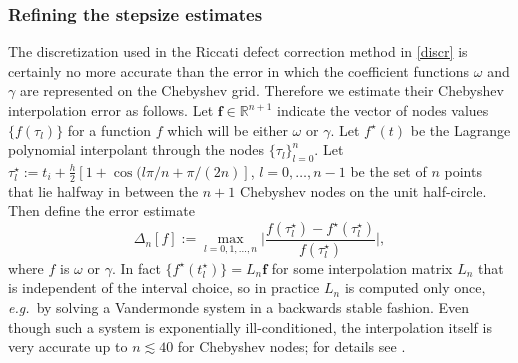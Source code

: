 \documentclass[10pt]{article}
\newcommand{\be}{\begin{equation}}
\newcommand{\ee}{\end{equation}}
\newcommand{\eg}{{\it e.g.\ }}
\newcommand{\mbf}[1]{{\mathbf #1}}
\newcommand{\R}{\mathbb{R}}
\newcommand{\om}{\omega}
\newcommand{\g}{\gamma}
\begin{document}
\subsubsection{Refining the stepsize estimates}

%

The discretization used in the Riccati defect correction method in \cref{discr} is certainly no more accurate than
the error in which the coefficient functions $\om$ and $\g$ are represented
on the Chebyshev grid.
Therefore we estimate their Chebyshev interpolation error as follows.
Let $\mbf{f}\in\R^{n+1}$ indicate the vector of nodes values
$\{f(\tau_l)\}$ for a function $f$ which will be either $\om$ or $\g$.
Let $f^\star(t)$ be the Lagrange polynomial interpolant through the
nodes $\{\tau_l\}_{l=0}^n$.
Let $\tau^\star_l := t_i + \tfrac{h}{2}[1 + \cos(l\pi/n + \pi/(2n)]$, $l=0,\dots,n-1$ be the set of $n$ points that lie halfway in between the $n+1$ Chebyshev nodes on the unit half-circle.
Then define the error estimate
\be
    \Delta_n[f] := \max_{l = 0, 1, \ldots, n} \biggl| \frac{f(\tau^{\star}_l) -
    f^{\star}(\tau^{\star}_l)}{f(\tau^{\star}_l)} \biggr|,
\ee
where $f$ is $\om$ or $\g$.
In fact $\{f^{\star}(t^{\star}_l)\} = L_n \mbf{f}$ for some interpolation matrix
$L_n$ that is independent of the interval choice, so in practice
$L_n$ is computed only once, \eg by solving a Vandermonde system in a backwards
stable fashion.
Even though such a system is exponentially ill-conditioned,
the interpolation itself is very accurate up to $n \lesssim 40$
for Chebyshev nodes; for details see
\cite[Appendix A]{helsing_close}.
\end{document}
